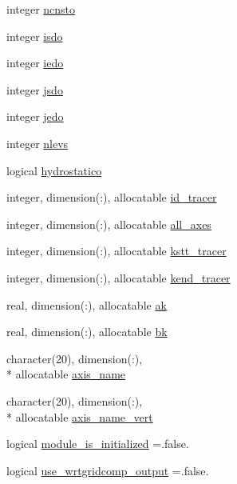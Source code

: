 \begin{DoxyCompactItemize}
integer \hyperlink{classfv__nggps__diags__mod_aa4520f56a48c115c6fbe88f3855fdf8c}{ncnsto}
\item 
integer \hyperlink{classfv__nggps__diags__mod_ac61f1b2f52e12f3e0e351d5016c2b414}{isdo}
\item 
integer \hyperlink{classfv__nggps__diags__mod_ae7a3518a61e0e94f8076c43be5be6678}{iedo}
\item 
integer \hyperlink{classfv__nggps__diags__mod_ae65d337428ccfa00e3ab41cb9601d57d}{jsdo}
\item 
integer \hyperlink{classfv__nggps__diags__mod_a5dfb7589948d6b78782b87990c55f88d}{jedo}
\item 
integer \hyperlink{classfv__nggps__diags__mod_a45187525edfc30bf711eeb0bb8efb040}{nlevs}
\item 
logical \hyperlink{classfv__nggps__diags__mod_a3cc8e2ed9272c3c8703ce8acea63b841}{hydrostatico}
\item 
integer, dimension(\-:), allocatable \hyperlink{classfv__nggps__diags__mod_a10e0ceae3cbe500fac557d39d5ce87ed}{id\-\_\-tracer}
\item 
integer, dimension(\-:), allocatable \hyperlink{classfv__nggps__diags__mod_ad7f236d66e4b3d41e0501bd9693bdd9e}{all\-\_\-axes}
\item 
integer, dimension(\-:), allocatable \hyperlink{classfv__nggps__diags__mod_a7f1246aa235291e0baf4f056f7d05895}{kstt\-\_\-tracer}
\item 
integer, dimension(\-:), allocatable \hyperlink{classfv__nggps__diags__mod_acf7563c97e50eba24a2800623db2c963}{kend\-\_\-tracer}
\item 
real, dimension(\-:), allocatable \hyperlink{classfv__nggps__diags__mod_ad97d0a85431a2677248d025ec37b3630}{ak}
\item 
real, dimension(\-:), allocatable \hyperlink{classfv__nggps__diags__mod_a3bfc67471e76aec3cec99058b20cd5a0}{bk}
\item 
character(20), dimension(\-:), \\*
allocatable \hyperlink{classfv__nggps__diags__mod_a9b3c6afd1c1d787a6025594b51ffbe41}{axis\-\_\-name}
\item 
character(20), dimension(\-:), \\*
allocatable \hyperlink{classfv__nggps__diags__mod_aa890948022803ec69a3d017f66653db6}{axis\-\_\-name\-\_\-vert}
\item 
logical \hyperlink{classfv__nggps__diags__mod_abc0aa3699a7eff720af358c47301af18}{module\-\_\-is\-\_\-initialized} =.false.
\item 
logical \hyperlink{classfv__nggps__diags__mod_a70632914cad68cbfde798ff630987d0f}{use\-\_\-wrtgridcomp\-\_\-output} =.false.

\end{DoxyCompactItemize}
